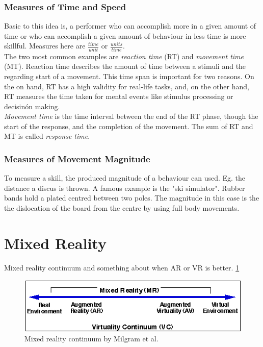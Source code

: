 \subsubsection{Measures of Time and Speed}
Basic to this idea is, a performer who can accomplish more in a given amount of time or who can accomplish a given amount of behaviour in less time is  more skillful. Measures here are
$\frac{time}{unit}$ or $\frac{units}{time}$.\\
The two most common examples are \textit{reaction time} (RT) and \textit{movement time} (MT). Reaction time describes the amount of time between a stimuli and the regarding start of a movement. This time span is important for two reasons. On the on hand, RT has a high validity for real-life tasks, and, on the other hand, RT measures the time taken for mental events like stimulus processing or decisinón making.\\
\textit{Movement time} is the time interval between the end of the RT phase, though the start of the response, and the completion of the movement. The sum of RT and MT is called \textit{response time}.

\subsubsection{Measures of Movement Magnitude}
To measure a skill, the produced magnitude of a behaviour can used. Eg. the distance a discus is thrown. A famous example is the "ski simulator". Rubber bands hold a plated centred between two poles. The magnitude in this case is the the dislocation of the board from the centre by using full body movements.

\section{Mixed Reality}
Mixed reality continuum \cite{Milgram1994} and something about when AR or VR is better. \ref{fig:MRcont} \todo \markAsevenMR

\begin{figure}
	\centering
	\includegraphics[width=1.0\textwidth]{img/milgram_continuum.png}
	\caption{Mixed reality continuum by Milgram et al. \cite{Milgram1994}}
	\label{fig:MRcont}
\end{figure}


